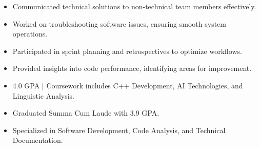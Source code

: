 \par\smallskip
\noindent
\begin{minipage}{20cm}
  \begin{minipage}{9.75cm}
    \begin{itemize}
      \item Communicated technical solutions to non-technical team members effectively.
      \item Worked on troubleshooting software issues, ensuring smooth system operations.
    \end{itemize}
  \end{minipage}
  \hfill
  \begin{minipage}{9.75cm}
    \begin{itemize}
      \item Participated in sprint planning and retrospectives to optimize workflows.
      \item Provided insights into code performance, identifying areas for improvement.
    \end{itemize}
  \end{minipage}
\end{minipage}
\par\smallskip
\divider

\begin{itemize}
  \item 4.0 GPA | Coursework includes C++ Development, AI Technologies, and Linguistic Analysis.
\end{itemize}
\divider

\begin{itemize}
  \item Graduated Summa Cum Laude with 3.9 GPA.
  \item Specialized in Software Development, Code Analysis, and Technical Documentation.
\end{itemize}

\noindent
\begin{minipage}{20cm}
\end{minipage}


